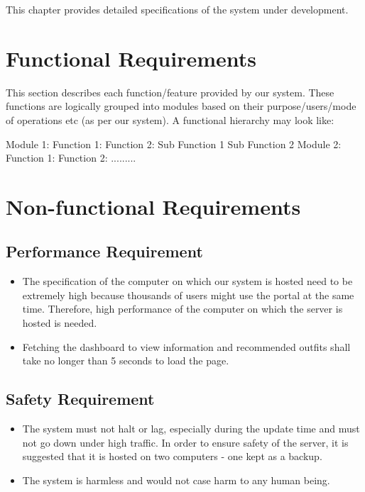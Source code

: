 This chapter provides detailed specifications of the system under development.

\section{Functional Requirements}

This section describes each function/feature provided by our system. These functions are logically grouped into modules based on their purpose/users/mode of operations etc (as per our system). A functional hierarchy may look like:
\begin{outline}
  \1 Module 1:
  \2 Function 1:
  \2 Function 2:
  \3 Sub Function 1
  \3 Sub Function 2
  \1 Module 2:
  \2 Function 1:
  \2 Function 2:
  \1 .........
\end{outline}


\section{Non-functional Requirements}

\subsection{Performance Requirement}

\begin{itemize}
    \item The specification of the computer on which our system is hosted need to be extremely high because thousands of users might use the portal at the same time. Therefore, high performance of the computer on which the server is hosted is needed.
    
    \item Fetching the dashboard to view information and recommended outfits shall take no longer than 5 seconds to load the page.
\end{itemize}

\subsection{Safety Requirement}
\begin{itemize}
    \item The system must not halt or lag, especially during the update time and must not go down under high traffic. In order to ensure safety of the server, it is suggested that it is hosted on two computers - one kept as a backup.
    
    \item The system is harmless and would  not case harm to any human being.
\end{itemize}

